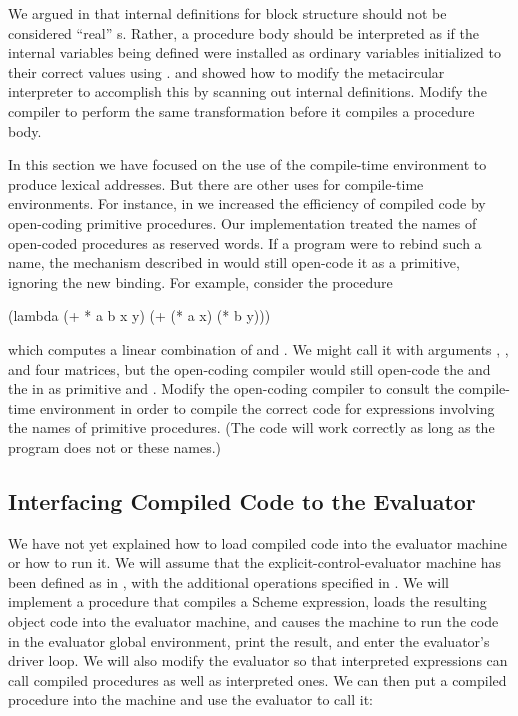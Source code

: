 \begin{exercise}
	\label{Exercise 5.43}
	We argued in  that internal definitions for block structure should not be considered “real” s.
	Rather, a procedure body should be interpreted as if the internal variables being defined were installed as ordinary  variables initialized to their correct values using .
	 and  showed how to modify the metacircular interpreter to accomplish this by scanning out internal definitions.
	Modify the compiler to perform the same transformation before it compiles a procedure body.
\end{exercise}



\begin{exercise}
	\label{Exercise 5.44}
	In this section we have focused on the use of the compile-time environment to produce lexical addresses.
	But there are other uses for compile-time environments.
	For instance, in  we increased the efficiency of compiled code by open-coding primitive procedures.
	Our implementation treated the names of open-coded procedures as reserved words.
	If a program were to rebind such a name, the mechanism described in  would still open-code it as a primitive, ignoring the new binding.
	For example, consider the procedure
	\begin{scheme}
	  (lambda (+ * a b x y)
	    (+ (* a x) (* b y)))
	\end{scheme}
	which computes a linear combination of  and .
	We might call it with arguments , , and four matrices, but the open-coding compiler would still open-code the \code{+} and the \code{*} in  as primitive \code{+} and \code{*}.
	Modify the open-coding compiler to consult the compile-time environment in order to compile the correct code for expressions involving the names of primitive procedures.
	(The code will work correctly as long as the program does not  or  these names.)
\end{exercise}



\subsection{Interfacing Compiled Code to the Evaluator}
\label{Section 5.5.7}

We have not yet explained how to load compiled code into the evaluator machine or how to run it.
We will assume that the explicit-control-evaluator machine has been defined as in , with the additional operations specified in .
We will implement a procedure  that compiles a Scheme expression, loads the resulting object code into the evaluator machine, and causes the machine to run the code in the evaluator global environment, print the result, and enter the evaluator’s driver loop.
We will also modify the evaluator so that interpreted expressions can call compiled procedures as well as interpreted ones.
We can then put a compiled procedure into the machine and use the evaluator to call it:

